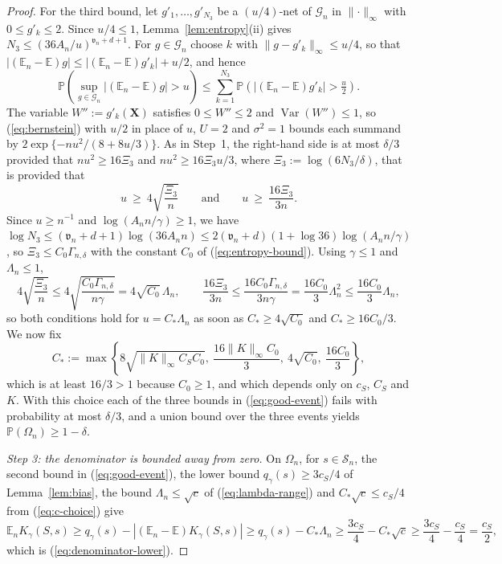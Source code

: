 \documentclass{article} %
\begin{document}
\begin{proof}
For the third bound, let $g'_1,\ldots,g'_{N_3}$ be a $(u/4)$-net of $\mathcal{G}_n$ in $\lVert\cdot\rVert_\infty$ with $0\le g'_k\le2$.  Since $u/4\le1$, Lemma~\ref{lem:entropy}(ii) gives $N_3\le(36A_n/u)^{\mathfrak{v}_n+d+1}$.  For $g\in\mathcal{G}_n$ choose $k$ with $\lVert g-g'_k\rVert_\infty\le u/4$, so that $|(\mathbb{E}_n-\mathbb{E})g|\le|(\mathbb{E}_n-\mathbb{E})g'_k|+u/2$, and hence
\[
  \mathbb{P}\left(\sup_{g\in\mathcal{G}_n}\left|(\mathbb{E}_n-\mathbb{E})g\right|>u\right)
  \le\sum_{k=1}^{N_3}\mathbb{P}\left(\left|(\mathbb{E}_n-\mathbb{E})g'_k\right|>\tfrac{u}{2}\right).
\]
The variable $W'':=g'_k(\mathbf{X})$ satisfies $0\le W''\le2$ and $\operatorname{Var}(W'')\le1$, so (\ref{eq:bernstein}) with $u/2$ in place of $u$, $U=2$ and $\sigma^2=1$ bounds each summand by $2\exp\{-nu^2/(8+8u/3)\}$.  As in Step~1, the right-hand side is at most $\delta/3$ provided that $nu^2\ge16\Xi_3$ and $nu^2\ge16\Xi_3u/3$, where $\Xi_3:=\log(6N_3/\delta)$, that is provided that
\[
  u\ \ge\ 4\sqrt{\frac{\Xi_3}{n}}
  \qquad\text{and}\qquad
  u\ \ge\ \frac{16\Xi_3}{3n} .
\]
Since $u\ge n^{-1}$ and $\log(A_nn/\gamma)\ge1$, we have $\log N_3\le(\mathfrak{v}_n+d+1)\log(36A_nn)\le2(\mathfrak{v}_n+d)(1+\log36)\log(A_nn/\gamma)$, so $\Xi_3\le C_0\Gamma_{n,\delta}$ with the constant $C_0$ of (\ref{eq:entropy-bound}).  Using $\gamma\le1$ and $\Lambda_n\le1$,
\[
  4\sqrt{\frac{\Xi_3}{n}}
  \le4\sqrt{\frac{C_0\Gamma_{n,\delta}}{n\gamma}}
  =4\sqrt{C_0}\,\Lambda_n ,
  \qquad
  \frac{16\Xi_3}{3n}
  \le\frac{16C_0\Gamma_{n,\delta}}{3n\gamma}
  =\frac{16C_0}{3}\Lambda_n^2
  \le\frac{16C_0}{3}\Lambda_n ,
\]
so both conditions hold for $u=C_\ast\Lambda_n$ as soon as $C_\ast\ge4\sqrt{C_0}$ and $C_\ast\ge16C_0/3$.  We now fix
\begin{equation}
  C_\ast:=\max\left\{
    8\sqrt{\lVert K\rVert_\infty C_SC_0},\
    \frac{16\lVert K\rVert_\infty C_0}{3},\
    4\sqrt{C_0},\
    \frac{16C_0}{3}\right\},
  \label{eq:cstar-choice}
\end{equation}
which is at least $16/3>1$ because $C_0\ge1$, and which depends only on $c_S$, $C_S$ and $K$.  With this choice each of the three bounds in (\ref{eq:good-event}) fails with probability at most $\delta/3$, and a union bound over the three events yields $\mathbb{P}(\Omega_n)\ge1-\delta$.

\emph{Step 3: the denominator is bounded away from zero.}  On $\Omega_n$, for $s\in\mathcal{S}_n$, the second bound in (\ref{eq:good-event}), the lower bound $q_{\gamma}(s)\ge3c_S/4$ of Lemma~\ref{lem:bias}, the bound $\Lambda_n\le\sqrt{c}$ of (\ref{eq:lambda-range}) and $C_\ast\sqrt{c}\le c_S/4$ from (\ref{eq:c-choice}) give
\[
  \mathbb{E}_nK_{\gamma}(S,s)
  \ge q_{\gamma}(s)-\left|(\mathbb{E}_n-\mathbb{E})K_{\gamma}(S,s)\right|
  \ge q_{\gamma}(s)-C_\ast\Lambda_n
  \ge\frac{3c_S}{4}-C_\ast\sqrt{c}
  \ge\frac{3c_S}{4}-\frac{c_S}{4}
  =\frac{c_S}{2} ,
\]
which is (\ref{eq:denominator-lower}).
\end{proof}
\end{document}
